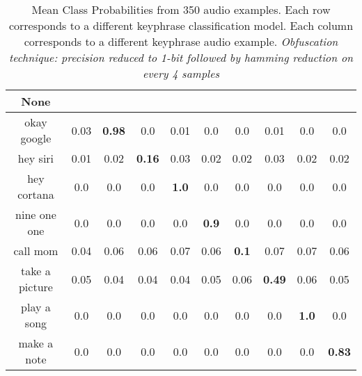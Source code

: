 \begin{table}[!th]
\begin{tabular}{cccccccccc}%
\hline%
None&\rotate{random talk}{70}&\rotate{okay google}{70}&\rotate{hey siri}{70}&\rotate{hey cortana}{70}&\rotate{nine one one}{70}&\rotate{call mom}{70}&\rotate{take a picture}{70}&\rotate{play a song}{70}&\rotate{make a note}{70}\\%
\hline%
okay google&0.03&\textbf{0.98}&0.0&0.01&0.0&0.0&0.01&0.0&0.0\\%
hey siri&0.01&0.02&\textbf{0.16}&0.03&0.02&0.02&0.03&0.02&0.02\\%
hey cortana&0.0&0.0&0.0&\textbf{1.0}&0.0&0.0&0.0&0.0&0.0\\%
nine one one&0.0&0.0&0.0&0.0&\textbf{0.9}&0.0&0.0&0.0&0.0\\%
call mom&0.04&0.06&0.06&0.07&0.06&\textbf{0.1}&0.07&0.07&0.06\\%
take a picture&0.05&0.04&0.04&0.04&0.05&0.06&\textbf{0.49}&0.06&0.05\\%
play a song&0.0&0.0&0.0&0.0&0.0&0.0&0.0&\textbf{1.0}&0.0\\%
make a note&0.0&0.0&0.0&0.0&0.0&0.0&0.0&0.0&\textbf{0.83}\\%
\hline%
\end{tabular}
\caption{Mean Class Probabilities from 350 audio examples. Each row corresponds to a different keyphrase classification model. Each column corresponds to a different keyphrase audio example. \emph{Obfuscation technique: precision reduced to 1-bit followed by hamming reduction on every 4 samples}}
\label{tab:probs_precision_1_hamming_4}
\end{table}



